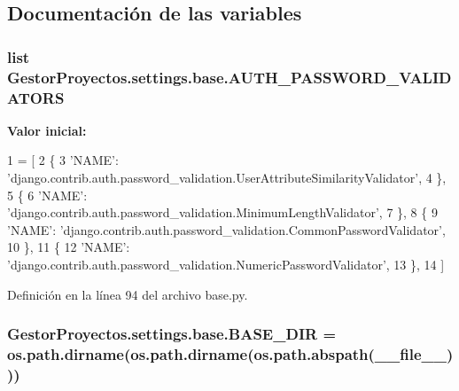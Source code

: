 \subsection{Documentación de las variables}
\subsubsection[{\texorpdfstring{A\+U\+T\+H\+\_\+\+P\+A\+S\+S\+W\+O\+R\+D\+\_\+\+V\+A\+L\+I\+D\+A\+T\+O\+RS}{AUTH_PASSWORD_VALIDATORS}}]{\setlength{\rightskip}{0pt plus 5cm}list Gestor\+Proyectos.\+settings.\+base.\+A\+U\+T\+H\+\_\+\+P\+A\+S\+S\+W\+O\+R\+D\+\_\+\+V\+A\+L\+I\+D\+A\+T\+O\+RS}\hypertarget{namespace_gestor_proyectos_1_1settings_1_1base_a0e880b92b71be5123ac92abc6a87b2a0}{}\label{namespace_gestor_proyectos_1_1settings_1_1base_a0e880b92b71be5123ac92abc6a87b2a0}
{\bfseries Valor inicial\+:}
\begin{DoxyCode}
1 = [
2     \{
3         \textcolor{stringliteral}{'NAME'}: \textcolor{stringliteral}{'django.contrib.auth.password\_validation.UserAttributeSimilarityValidator'},
4     \},
5     \{
6         \textcolor{stringliteral}{'NAME'}: \textcolor{stringliteral}{'django.contrib.auth.password\_validation.MinimumLengthValidator'},
7     \},
8     \{
9         \textcolor{stringliteral}{'NAME'}: \textcolor{stringliteral}{'django.contrib.auth.password\_validation.CommonPasswordValidator'},
10     \},
11     \{
12         \textcolor{stringliteral}{'NAME'}: \textcolor{stringliteral}{'django.contrib.auth.password\_validation.NumericPasswordValidator'},
13     \},
14 ]
\end{DoxyCode}


Definición en la línea 94 del archivo base.\+py.

\subsubsection[{\texorpdfstring{B\+A\+S\+E\+\_\+\+D\+IR}{BASE_DIR}}]{\setlength{\rightskip}{0pt plus 5cm}Gestor\+Proyectos.\+settings.\+base.\+B\+A\+S\+E\+\_\+\+D\+IR = os.\+path.\+dirname(os.\+path.\+dirname(os.\+path.\+abspath(\+\_\+\+\_\+file\+\_\+\+\_\+)))}\hypertarget{namespace_gestor_proyectos_1_1settings_1_1base_a58a73f3168062df9c490527febb58c82}{}\label{namespace_gestor_proyectos_1_1settings_1_1base_a58a73f3168062df9c490527febb58c82}


